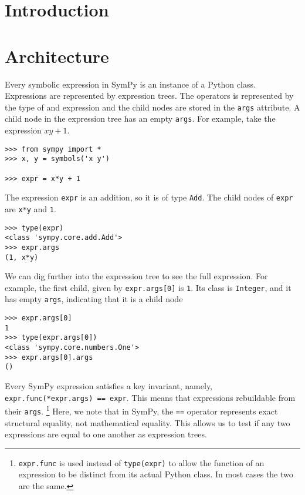 \documentclass{article}
\begin{document}
\section{Introduction}


\section{Architecture}


Every symbolic expression in SymPy is an instance of a Python class.
Expressions are represented by expression trees. The operators is represented
by the type of and expression and the child nodes are stored in the \texttt{args}
attribute. A child node in the expression tree has an empty \texttt{args}. For
example, take the expression $xy + 1$.

\begin{verbatim}
>>> from sympy import *
>>> x, y = symbols('x y')

>>> expr = x*y + 1
\end{verbatim}

The expression \texttt{expr} is an addition, so it is of type \texttt{Add}. The child
nodes of \texttt{expr} are \texttt{x*y} and \texttt{1}.

\begin{verbatim}
>>> type(expr)
<class 'sympy.core.add.Add'>
>>> expr.args
(1, x*y)
\end{verbatim}

We can dig further into the expression tree to see the full expression. For
example, the first child, given by \texttt{expr.args[0]} is \texttt{1}. Its class is
\texttt{Integer}, and it has empty \texttt{args}, indicating that it is a child node

\begin{verbatim}
>>> expr.args[0]
1
>>> type(expr.args[0])
<class 'sympy.core.numbers.One'>
>>> expr.args[0].args
()
\end{verbatim}

Every SymPy expression satisfies a key invariant, namely,
\texttt{expr.func(*expr.args) == expr}. This means that expressions rebuildable
from their \texttt{args}. \footnote{\texttt{expr.func} is used instead of
  \texttt{type(expr)} to allow the function of an expression to be distinct from
  its actual Python class. In most cases the two are the same.} Here, we note
that in SymPy, the \texttt{==} operator represents exact structural equality, not
mathematical equality. This allows us to test if any two expressions are equal
to one another as expression trees.
\end{document}
